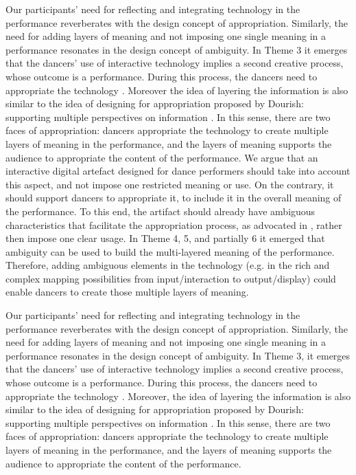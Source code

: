 Our participants' need for reflecting and integrating technology in the performance reverberates with the design concept of appropriation. Similarly, the need for adding layers of meaning and not imposing one single meaning in a performance resonates in the design concept of ambiguity.
In Theme 3 it emerges that the dancers' use of interactive technology implies a second creative process, whose outcome is a performance. During this process, the dancers need to appropriate the technology \cite{dix2007designing}. Moreover the idea of layering the information is also similar to the idea of designing for appropriation proposed by Dourish: supporting multiple perspectives on information \cite{dourish2003appropriation}.
In this sense, there are two faces of appropriation: dancers { appropriate} the technology to create multiple layers of meaning in the performance, and the layers of meaning supports the audience to { appropriate} the content of the performance.
We argue that an interactive digital  artefact designed for dance performers should take into account this aspect, and not impose one restricted meaning or use. On the contrary, it should support dancers to appropriate it, to include it in the overall meaning of the performance. To this end, the artifact should already have ambiguous characteristics that facilitate the appropriation process, as advocated in \cite{gaver2003ambiguity}, rather then impose one clear usage. In Theme 4, 5, and partially 6 it emerged that ambiguity can be used to build the multi-layered meaning of the performance. Therefore, adding ambiguous elements in the technology (e.g. in the rich and complex mapping possibilities  from input/interaction to output/display) could enable dancers to create those multiple layers of meaning. %

Our participants’ need for reflecting and integrating technology in the performance reverberates with the design concept of appropriation. Similarly, the need for adding layers of meaning and not imposing one single meaning in a performance resonates in the design concept of ambiguity. In Theme 3, it emerges that the dancers’ use of interactive technology implies a second creative process, whose outcome is a performance. During this process, the dancers need to appropriate the technology \cite{dix2007designing}. Moreover, the idea of layering the information is also similar to the idea of designing for appropriation proposed by Dourish: supporting multiple perspectives on information \cite{dourish2003appropriation}. In this sense, there are two faces of appropriation: dancers appropriate the technology to create multiple layers of meaning in the performance, and the layers of meaning supports the audience to appropriate the content of the performance.

